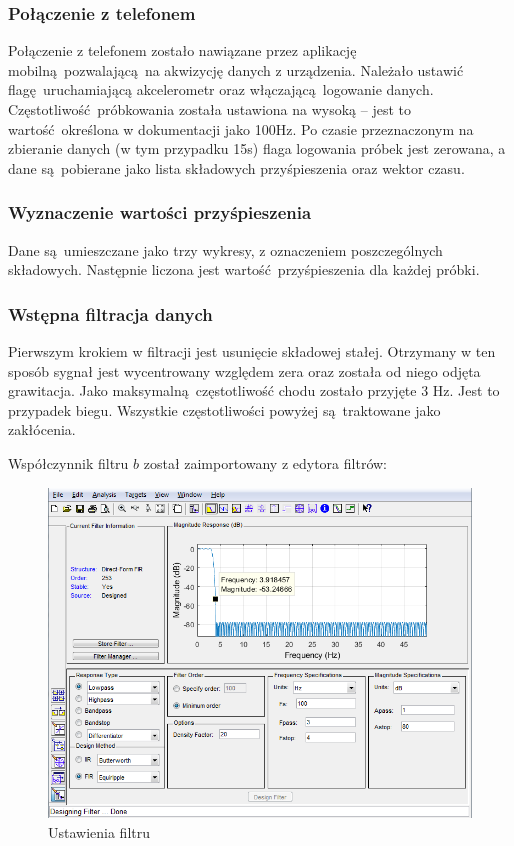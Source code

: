 \documentclass[a4paper, 12pt, titlepage]{article}
\begin{document}
            \subsubsection{Połączenie z telefonem}
                Połączenie z telefonem zostało nawiązane przez
                aplikację mobilną pozwalającą na akwizycję danych
                z urządzenia. Należało ustawić flagę uruchamiającą
                akcelerometr oraz włączającą logowanie danych.
                Częstotliwość próbkowania została ustawiona na wysoką --
                jest to wartość określona w dokumentacji jako 100Hz. 
                Po czasie przeznaczonym na zbieranie danych (w tym
                przypadku 15s) flaga logowania próbek jest zerowana, 
                a dane są pobierane jako lista składowych przyśpieszenia
                oraz wektor czasu.
                
            \subsubsection{Wyznaczenie wartości przyśpieszenia}
                Dane są umieszczane jako trzy wykresy, z oznaczeniem
                poszczególnych składowych. Następnie liczona jest
                wartość przyśpieszenia dla każdej próbki.
                
            \subsubsection{Wstępna filtracja danych}
                Pierwszym krokiem w filtracji jest usunięcie składowej
                stałej. Otrzymany w ten sposób sygnał jest wycentrowany
                względem zera oraz została od niego odjęta grawitacja.
                Jako maksymalną częstotliwość chodu zostało przyjęte 3 
                Hz. Jest to przypadek biegu. Wszystkie częstotliwości
                powyżej są traktowane jako zakłócenia.
                \newpage
                
                Współczynnik filtru $b$ został zaimportowany z edytora
                filtrów:
                \begin{figure}[H]
                    \centering
                    \includegraphics[width=0.9\columnwidth]{filtr.png}
                    \caption{Ustawienia filtru}
                \end{figure}\noindent
\end{document}
